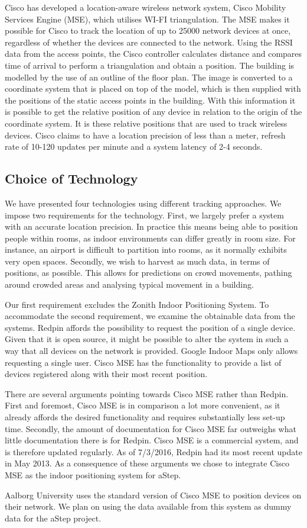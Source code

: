 Cisco has developed a location-aware wireless network system, Cisco Mobility Services Engine (MSE), which utilises WI-FI triangulation\cite{CiscoTri}. The MSE makes it possible for Cisco to track the location of up to 25000 network devices at once, regardless of whether the devices are connected to the network. Using the RSSI data from the access points, the Cisco controller calculates distance and compares time of arrival to perform a triangulation and obtain a position\cite{ciscoMSE}.
The building is modelled by the use of an outline of the floor plan. The image is converted to a coordinate system that is placed on top of the model, which is then supplied with the positions of the static access points in the building. With this information it is possible to get the relative position of any device in relation to the origin of the coordinate system. It is these relative positions that are used to track wireless devices.
Cisco claims to have a location precision of less than a meter, refresh rate of 10-120 updates per minute and a system latency of 2-4 seconds\cite{dimensions}. 

\subsection{Choice of Technology}\label{subsec:cisco}
We have presented four technologies using different tracking approaches. We impose two requirements for the technology. First, we largely prefer a system with an accurate location precision. In practice this means being able to position people within rooms, as indoor environments can differ greatly in room size. For instance, an airport is difficult to partition into rooms, as it normally exhibits very open spaces. Secondly, we wish to harvest as much data, in terms of positions, as possible. This allows for predictions on crowd movements, pathing around crowded areas and analysing typical movement in a building. 

Our first requirement excludes the Zonith Indoor Positioning System. To accommodate the second requirement, we examine the obtainable data from the systems. Redpin affords the possibility to request the position of a single device. Given that it is open source, it might be possible to alter the system in such a way that all devices on the network is provided. Google Indoor Maps only allows requesting a single user. Cisco MSE has the functionality to provide a list of devices registered along with their most recent position.

There are several arguments pointing towards Cisco MSE rather than Redpin. First and foremost, Cisco MSE is in comparison a lot more convenient, as it already affords the desired functionality and requires substantially less set-up time. Secondly, the amount of documentation for Cisco MSE far outweighs what little documentation there is for Redpin. Cisco MSE is a commercial system, and is therefore updated regularly. As of 7/3/2016, Redpin had its most recent update in May 2013. As a consequence of these arguments we chose to integrate Cisco MSE as the indoor positioning system for aStep.

Aalborg University uses the standard version of Cisco MSE to position devices on their network. We plan on using the data available from this system as dummy data for the aStep project.